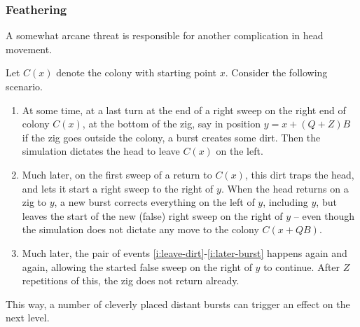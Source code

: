 \documentclass[12pt]{memoir}
\newcommand{\fld}[1]{\ensuremath{\textit{#1\/}}}
\newcommand{\rul}[1]{\ensuremath{\texttt{\slshape #1\/}}}
\def\B{B}
\newcommand{\Z}{Z}
\newcommand{\Sweep}{\fld{Sw}}
\newcommand{\cSweep}{\fld{cSw}}
\newcommand{\ruSwing}{\rul{Swing}}
\begin{document}

\subsubsection{Feathering}\label{sec:feathering}

A somewhat arcane
threat is responsible for another complication in head movement.

\begin{example}\label{xmp:feather-need}
Let \( C(x) \) denote the colony with starting point \( x \).
Consider the following scenario.

\begin{enumerate}
\item\label{i:leave-dirt}
At some time, at a last turn at the end of a right sweep on the right end of
colony \( C(x) \), at the bottom of the zig, say in
position \( y = x+(Q+Z)\B \) if the zig goes outside the colony, a burst creates some dirt.
Then the simulation dictates the head to leave \( C(x) \) on the left.

\item\label{i:later-burst} 
Much later, on the first sweep of a return to \( C(x) \), this dirt traps the head, and
lets it start a right sweep to the right of \( y \).  
When the head returns on a zig to \( y \), 
a new burst corrects everything on the left of \( y \), including \( y \), but leaves
the start of the new (false) right sweep on the right of \( y \) -- even though
the simulation does not dictate any move to the colony \( C(x+Q\B) \).

\item\label{i:repeat} Much later, the pair of events \ref{i:leave-dirt}-\ref{i:later-burst}
happens again and again, allowing the started false sweep on the right of \( y \) to continue.
After \( \Z \) repetitions of this, the zig does not return already.

\end{enumerate}
This way, a number of cleverly placed distant bursts can trigger an effect on the
next level.

\end{example}
\end{document}

